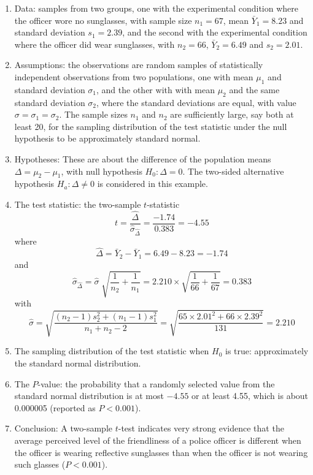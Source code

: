 \documentclass[11pt,a4paper,openany]{book}
\begin{document}
\begin{enumerate}
\def\labelenumi{\arabic{enumi}.}
\item
  Data: samples from two groups, one with the experimental condition
  where the officer wore no sunglasses, with sample size \(n_{1}=67\),
  mean \(\bar{Y}_{1}=8.23\) and standard deviation \(s_{1}=2.39\), and
  the second with the experimental condition where the officer did wear
  sunglasses, with \(n_{2}=66\), \(\bar{Y}_{2}=6.49\) and
  \(s_{2}=2.01\).
\item
  Assumptions: the observations are random samples of statistically
  independent observations from two populations, one with mean
  \(\mu_{1}\) and standard deviation \(\sigma_{1}\), and the other with
  with mean \(\mu_{2}\) and the same standard deviation \(\sigma_{2}\),
  where the standard deviations are equal, with value
  \(\sigma=\sigma_{1}=\sigma_{2}\). The sample sizes \(n_{1}\) and
  \(n_{2}\) are sufficiently large, say both at least 20, for the
  sampling distribution of the test statistic under the null hypothesis
  to be approximately standard normal.
\item
  Hypotheses: These are about the difference of the population means
  \(\Delta=\mu_{2}-\mu_{1}\), with null hypothesis \(H_{0}: \Delta=0\).
  The two-sided alternative hypothesis \(H_{a}: \Delta\ne 0\) is
  considered in this example.
\item
  The test statistic: the two-sample \(t\)-statistic
  \[t=\frac{\hat{\Delta}}{\hat{\sigma}_{\hat{\Delta}}}=
  \frac{-1.74}{0.383}=-4.55\] where
  \[\hat{\Delta}=\bar{Y}_{2}-\bar{Y}_{1}=6.49-8.23=-1.74\] and
  \[\hat{\sigma}_{\hat{\Delta}}=
  \hat{\sigma} \; \sqrt{\frac{1}{n_{2}}+\frac{1}{n_{1}}}
  =2.210 \times \sqrt{
  \frac{1}{66}+\frac{1}{67}}=0.383\] with \[\hat{\sigma}=
  \sqrt{\frac{(n_{2}-1)s^{2}_{2}+(n_{1}-1)s^{2}_{1}}{n_{1}+n_{2}-2}}
  =
  \sqrt{\frac{65\times 2.01^{2}+66\times 2.39^{2}}{131}}
  =2.210\]
\item
  The sampling distribution of the test statistic when \(H_{0}\) is
  true: approximately the standard normal distribution.
\item
  The \(P\)-value: the probability that a randomly selected value from
  the standard normal distribution is at most \(-4.55\) or at least
  4.55, which is about 0.000005 (reported as \(P<0.001\)).
\item
  Conclusion: A two-sample \(t\)-test indicates very strong evidence
  that the average perceived level of the friendliness of a police
  officer is different when the officer is wearing reflective sunglasses
  than when the officer is not wearing such glasses (\(P<0.001\)).
\end{enumerate}
\end{document}
